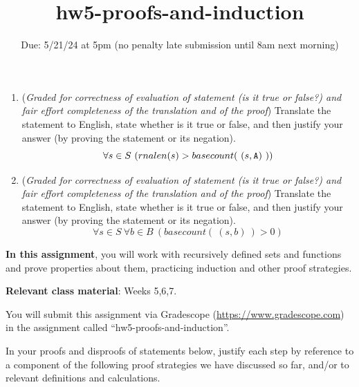 \begin{enumerate}[labelindent=0pt, leftmargin=0pt]
\begin{enumerate}
\item ({\it Graded for correctness of evaluation of statement (is it true or false?) 
and fair effort completeness of the translation and of the proof}) 
Translate the statement to English, state whether is it true or false, and then justify your answer (by proving the statement or its negation).
$$\forall s \in S~ (rnalen(s) > basecount( ~(s,\texttt{A})~))$$

\item ({\it Graded for correctness of evaluation of statement (is it true or false?) 
and fair effort completeness of the translation and of the proof}) 
Translate the statement to English, state whether is it true or false, and then justify your answer (by proving the statement or its negation).
$$\forall s \in S~ \forall b \in B ~( basecount( ~(s,b)~) > 0)$$

\end{enumerate}

\end{enumerate}

\newpage

\title{hw5-proofs-and-induction}
\date{Due: 5/21/24 at 5pm (no penalty late submission until 8am next morning)}

\maketitle
\thispagestyle{fancy}

{\bf In this assignment}, you will work with recursively defined sets and functions and prove 
properties about them, practicing induction and other proof strategies.

{\bf Relevant class material}: Weeks 5,6,7.

You will submit this assignment via Gradescope
(\href{https://www.gradescope.com}{https://www.gradescope.com}) 
in the assignment called ``hw5-proofs-and-induction''.

\instructions

In your proofs and disproofs of statements below, justify each  step
by reference to  a component of the  following proof  strategies
we  have discussed so far, and/or to relevant definitions and calculations.

\vspace{-10pt}


